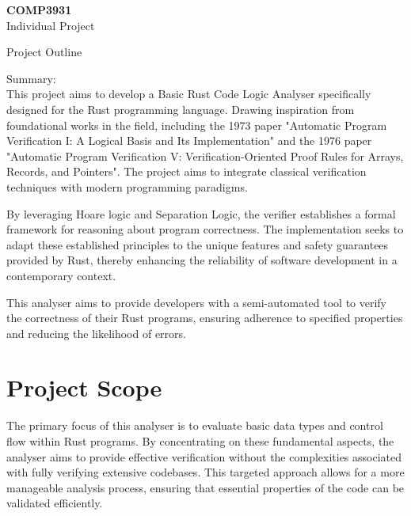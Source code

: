 \documentclass[11pt,a4paper]{article}
\begin{document}
\pagestyle{fancy}

\newcommand{\vect}[1]{\underline{\boldsymbol{#1}}}
\newcommand{\headingtitle}[1]{\textbf{#1}\normalsize\\}
\newcommand{\keyword}[1]{\colorbox{lightgray}{\texttt{#1}}}
\begin{center}
      \textbf{COMP3931}\\
      Individual Project\\
\end{center}
\vspace{11pt}
\begin{center}
      Project Outline
      \vspace{11pt}
\end{center}

Summary:\\
This project aims to develop a Basic Rust Code Logic Analyser specifically designed for the Rust programming language. Drawing inspiration from foundational works in the field, including the 1973 paper "Automatic Program Verification I: A Logical Basis and Its Implementation" and the 1976 paper "Automatic Program Verification V: Verification-Oriented Proof Rules for Arrays, Records, and Pointers". The project aims to integrate classical verification techniques with modern programming paradigms.

By leveraging Hoare logic and Separation Logic, the verifier establishes a formal framework for reasoning about program correctness. The implementation seeks to adapt these established principles to the unique features and safety guarantees provided by Rust, thereby enhancing the reliability of software development in a contemporary context.

This analyser aims to provide developers with a semi-automated tool to verify the correctness of their Rust programs, ensuring adherence to specified properties and reducing the likelihood of errors.

\pagebreak
\section{Project Scope}
The primary focus of this analyser is to evaluate basic data types and control flow within Rust programs. By concentrating on these fundamental aspects, the analyser aims to provide effective verification without the complexities associated with fully verifying extensive codebases. This targeted approach allows for a more manageable analysis process, ensuring that essential properties of the code can be validated efficiently.
\end{document}
